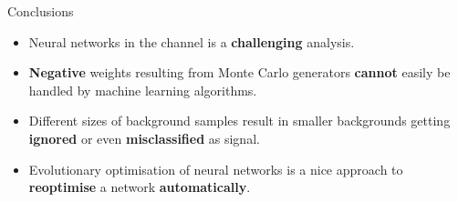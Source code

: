 \begin{frame}{Conclusions}
    \begin{itemize}
        \item Neural networks in the \tHq channel is a \textbf{challenging} analysis.
        \item \textbf{Negative} weights resulting from Monte Carlo generators \textbf{cannot} easily be handled by machine learning algorithms.
        \item Different sizes of background samples result in smaller backgrounds getting \textbf{ignored} or even \textbf{misclassified} as signal.
        \item Evolutionary optimisation of neural networks is a nice approach to \textbf{reoptimise} a network \textbf{automatically}.
    \end{itemize}
\end{frame}